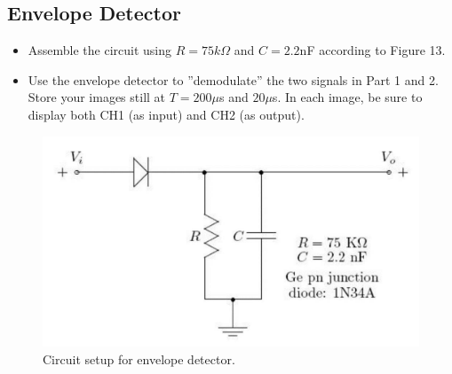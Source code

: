 \documentclass[a4paper]{article}
\begin{document}
\subsection{Envelope Detector}
\begin{itemize}
	\item Assemble the circuit using $R=75k\Omega$ and $C=2.2$nF according to Figure 13.
	\item Use the envelope detector to ”demodulate” the two signals in Part 1 and 2. Store your images still at $T=200\mu$s and $20\mu$s. In each image, be sure to display both CH1 (as input) and CH2 (as output).
\end{itemize}
\begin{figure}[H]
	\centering
	\includegraphics[width=0.7\linewidth]{13.jpg}
	\caption{Circuit setup for envelope detector.}
\end{figure}
\end{document}
